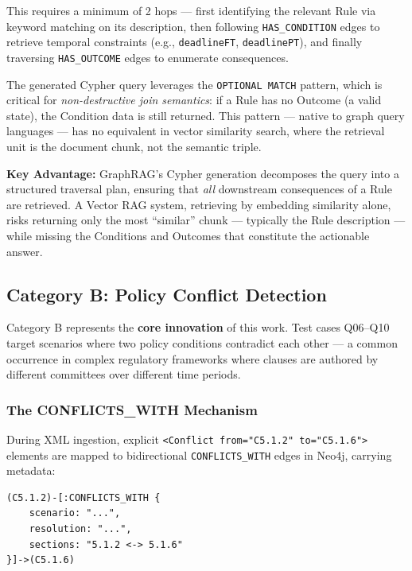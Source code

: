This requires a minimum of 2 hops — first identifying the relevant Rule via keyword matching on its description, then following \texttt{HAS\_CONDITION} edges to retrieve temporal constraints (e.g., \texttt{deadlineFT}, \texttt{deadlinePT}), and finally traversing \texttt{HAS\_OUTCOME} edges to enumerate consequences.

The generated Cypher query leverages the \texttt{OPTIONAL MATCH} pattern, which is critical for \textit{non-destructive join semantics}: if a Rule has no Outcome (a valid state), the Condition data is still returned. This pattern — native to graph query languages — has no equivalent in vector similarity search, where the retrieval unit is the document chunk, not the semantic triple.

\textbf{Key Advantage:} GraphRAG's Cypher generation decomposes the query into a structured traversal plan, ensuring that \textit{all} downstream consequences of a Rule are retrieved. A Vector RAG system, retrieving by embedding similarity alone, risks returning only the most ``similar'' chunk — typically the Rule description — while missing the Conditions and Outcomes that constitute the actionable answer.

\subsection{Category B: Policy Conflict Detection}
\label{sec:conflict}

Category B represents the \textbf{core innovation} of this work. Test cases Q06--Q10 target scenarios where two policy conditions contradict each other — a common occurrence in complex regulatory frameworks where clauses are authored by different committees over different time periods.

\subsubsection{The CONFLICTS\_WITH Mechanism}

During XML ingestion, explicit \texttt{<Conflict from="C5.1.2" to="C5.1.6">} elements are mapped to bidirectional \texttt{CONFLICTS\_WITH} edges in Neo4j, carrying metadata:

\begin{verbatim}
(C5.1.2)-[:CONFLICTS_WITH {
    scenario: "...",
    resolution: "...",
    sections: "5.1.2 <-> 5.1.6"
}]->(C5.1.6)
\end{verbatim}

